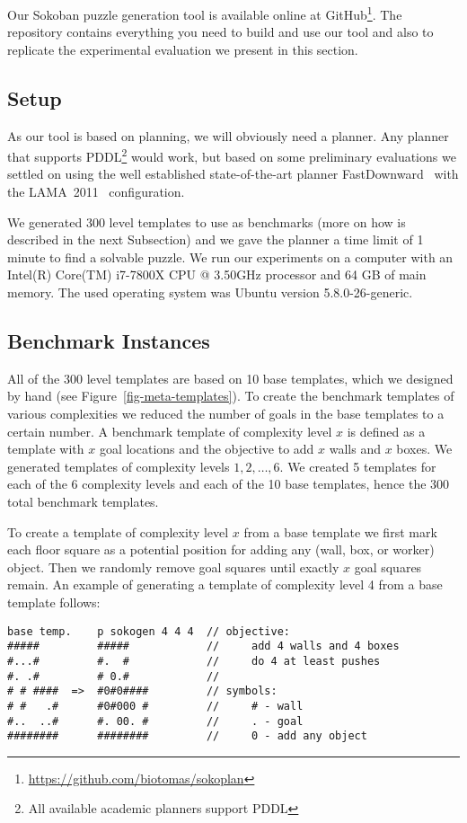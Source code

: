 \documentclass[runningheads]{llncs}
\begin{document}
Our Sokoban puzzle generation tool is available online at GitHub\footnote{\url{https://github.com/biotomas/sokoplan}}.
The repository contains everything you need to build and use our tool and also to replicate
the experimental evaluation we present in this section.

\subsection{Setup}
As our tool is based on planning, we will obviously need a planner. Any planner that supports PDDL\footnote{All available academic planners support PDDL} would work, but based on some preliminary evaluations we
settled on using the well established state-of-the-art planner FastDownward~\cite{helmert2006fast} with
the LAMA~2011~\cite{richter2011lama} configuration.

We generated 300 level templates to use as benchmarks (more on how is described in the next Subsection)
and we gave the planner a time limit of 1 minute to find a solvable puzzle. We run our experiments
on a computer with an Intel(R) Core(TM) i7-7800X CPU @ 3.50GHz processor and 64 GB of main memory.
The used operating system was Ubuntu version 5.8.0-26-generic.

\subsection{Benchmark Instances}
All of the 300 level templates are based on 10 base templates, which we designed by hand (see
Figure~\ref{fig-meta-templates}). To create the benchmark templates of various complexities
we reduced the number of goals in the base templates to a certain number. 
A benchmark template of complexity level $x$ is defined as a template with $x$ goal locations and
the objective to add $x$ walls and $x$ boxes.
We generated templates of complexity levels $1,2,\ldots,6$. We created 5 templates for each of 
the 6 complexity levels and each of the 10 base templates, hence the 300 total benchmark templates.

To create a template of complexity level $x$ from a base template we first mark each floor square
as a potential position for adding any (wall, box, or worker) object. Then we randomly remove
goal squares until exactly $x$ goal squares remain. An example of generating a template of complexity
level 4 from a base template follows:
\begin{verbatim}
base temp.    p sokogen 4 4 4  // objective:
#####         #####            //     add 4 walls and 4 boxes
#...#         #.  #            //     do 4 at least pushes 
#. .#         # 0.#            // 
# # ####  =>  #0#0####         // symbols: 
# #   .#      #0#000 #         //     # - wall     
#..  ..#      #. 00. #         //     . - goal     
########      ########         //     0 - add any object
\end{verbatim}
\end{document}

